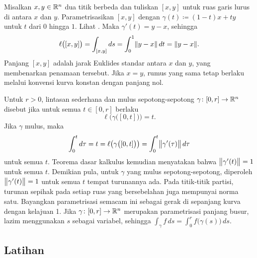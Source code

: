 \begin{example}
Misalkan $x,y \in {\mathbb{R}}^n$ dua titik berbeda dan tuliskan $[x,y]$ untuk ruas garis lurus
di antara $x$ dan $y$.  Parametrisasikan
$[x,y]$ dengan $\gamma(t) \coloneqq (1-t)x + ty$ untuk $t$ dari $0$ hingga $1$.
Lihat .
Maka $\gamma'(t) = y-x$, sehingga
\begin{equation*}
\ell\bigl([x,y]\bigr)
=
\int_{[x,y]} ds
=
\int_0^1 \lVert {y-x} \rVert \, dt
=
\lVert {y-x} \rVert .
\end{equation*}
Panjang $[x,y]$ adalah jarak Euklides standar antara $x$ dan $y$,
yang membenarkan penamaan tersebut.  Jika $x=y$, rumus yang sama tetap berlaku
melalui konvensi kurva konstan dengan panjang nol.
\begin{myfigureht}
\caption{Lintasan lurus antara $x$ dan $y$ yang diparametrisasikan
oleh $(1-t)x + ty$.\label{fig:straightpath}}
\end{myfigureht}
\end{example}

Untuk $r>0$, lintasan sederhana dan mulus sepotong-sepotong
$\gamma \colon [0,r] \to {\mathbb{R}}^n$ disebut
\emph{} jika
untuk semua $t \in [0,r]$ berlaku
\begin{equation*}
\ell\bigl( \gamma\bigl([0,t]\bigr) \bigr) = t .
\end{equation*}
Jika $\gamma$ mulus, maka
\begin{equation*}
\int_0^t d\tau =
t = \ell\bigl( \gamma\bigl([0,t]\bigr) \bigr) =
\int_0^t
\bigl\lVert {\gamma'(\tau)} \bigr\rVert
\, d\tau
\end{equation*}
untuk semua $t$.
Teorema dasar kalkulus kemudian menyatakan
bahwa $\bigl\lVert {\gamma'(t)} \bigr\rVert = 1$ untuk semua $t$.
Demikian pula, untuk $\gamma$ yang mulus sepotong-sepotong, diperoleh
$\bigl\lVert {\gamma'(t)} \bigr\rVert = 1$ untuk semua $t$ tempat turunannya ada.
Pada titik-titik partisi, turunan sepihak pada setiap ruas yang bersebelahan
juga mempunyai norma satu.
Bayangkan parametrisasi semacam ini sebagai gerak di sepanjang kurva dengan kelajuan
1.  Jika $\gamma \colon [0,r] \to {\mathbb{R}}^n$ merupakan parametrisasi panjang busur, lazim
menggunakan $s$ sebagai variabel, sehingga $\int_\gamma f \,ds
= \int_0^r f\bigl(\gamma(s)\bigr) \,ds$.

\subsection{Latihan}

